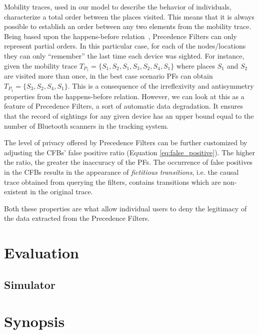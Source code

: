 Mobility traces, used in our model to describe the behavior of
individuals, characterize a total order between the places
visited. This means that it is always possible to establish an order
between any two elements from the mobility trace. Being based upon the
happens-before relation~\cite{Lamport:1978}, Precedence Filters can
only represent partial orders. In this particular case, for each of
the nodes/locations they can only ``remember'' the last time each
device was sighted. For instance, given the mobility trace
$T_{P_1}=\{S_1,S_2,S_1,S_3,S_2,S_4,S_1\}$ where places $S_1$ and $S_2$
are visited more than once, in the best case scenario PFs can obtain
$T_{P_1}=\{S_3,S_2,S_4,S_1\}$. This is a consequence of the
irreflexivity and antisymmetry properties from the happens-before
relation. However, we can look at this as a feature of Precedence
Filters, a sort of automatic data degradation. It ensures that the
record of sightings for any given device has an upper bound equal to
the number of Bluetooth scanners in the tracking system.

The level of privacy offered by Precedence Filters can be further
customized by adjusting the CFBs' false positive ratio (Equation
\ref{eq:false_positive}). The higher the ratio, the greater the
inaccuracy of the PFs. The occurrence of false positives in the CFBs
results in the appearance of \emph{fictitious transitions}, i.e. the
causal trace obtained from querying the filters, contains transitions
which are non-existent in the original trace. 

Both these properties are what allow individual users to deny the
legitimacy of the data extracted from the Precedence Filters.


\section{Evaluation}
\label{sec:ct-evaluation}

\subsection{Simulator}
\label{sec:simulator}


\section{Synopsis}
\label{sec:ct-synopsis}

